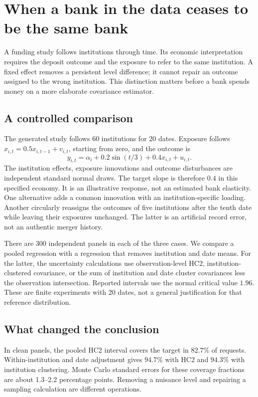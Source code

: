 \chapter{When a bank in the data ceases to be the same bank}
\label{gap29:funding}
A funding study follows institutions through time. Its economic interpretation
requires the deposit outcome and the exposure to refer to the same institution.
A fixed effect removes a persistent level difference; it cannot repair an outcome
assigned to the wrong institution. This distinction matters before a bank spends
money on a more elaborate covariance estimator.

\section{A controlled comparison}
The generated study follows 60 institutions for 20 dates. Exposure follows
$x_{i,t}=0.5x_{i,t-1}+v_{i,t}$, starting from zero, and the outcome is
\[
 y_{i,t}=\alpha_i+0.2\sin(t/3)+0.4x_{i,t}+u_{i,t}.
\]
The institution effects, exposure innovations and outcome disturbances are
independent standard normal draws. The target slope is therefore $0.4$ in this
specified economy. It is an illustrative response, not an estimated bank elasticity.
One alternative adds a common innovation with an institution-specific loading.
Another circularly reassigns the outcomes of five institutions after the tenth
date while leaving their exposures unchanged. The latter is an artificial
record error, not an authentic merger history.

There are 300 independent panels in each of the three cases. We compare a
pooled regression with a regression that removes institution and date means.
For the latter, the uncertainty calculations use observation-level HC2,
institution-clustered covariance, or the sum of institution and date cluster
covariances less the observation intersection. Reported intervals use the
normal critical value $1.96$. These are finite experiments with 20 dates, not
a general justification for that reference distribution.

\section{What changed the conclusion}
In clean panels, the pooled HC2 interval covers the target in $82.7\%$ of
requests. Within-institution and date adjustment gives $94.7\%$ with HC2 and
$94.3\%$ with institution clustering. Monte Carlo standard errors for these
coverage fractions are about 1.3--2.2 percentage points. Removing a nuisance
level and repairing a sampling calculation are different operations.

